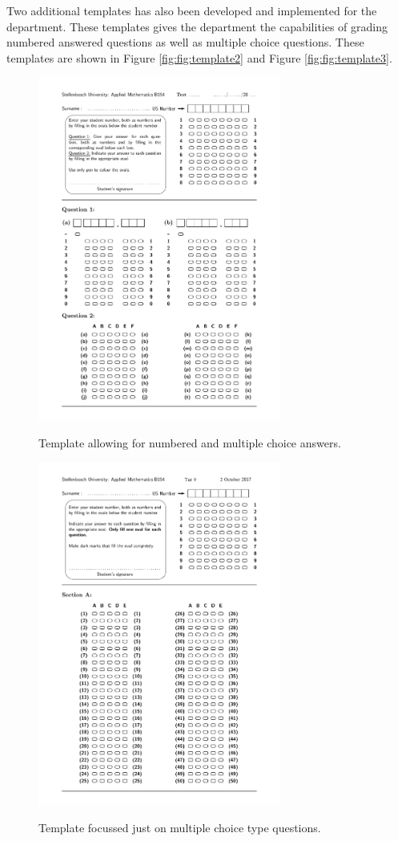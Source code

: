 Two additional templates has also been developed and implemented for the department. These templates gives the department the capabilities of grading numbered answered questions as well as multiple choice questions. These templates are shown in Figure \ref{fig:fig:template2} and Figure \ref{fig:fig:template3}.

\begin{figure}
  \centering
  \includegraphics[width=8cm]{template2}\\
  \caption{Template allowing for numbered and multiple choice answers.}
  \label{fig:template2}
\end{figure}

\begin{figure}
  \centering
  \includegraphics[width=8cm]{template3}\\
  \caption{Template focussed just on multiple choice type questions.}
  \label{fig:template3}
\end{figure}

